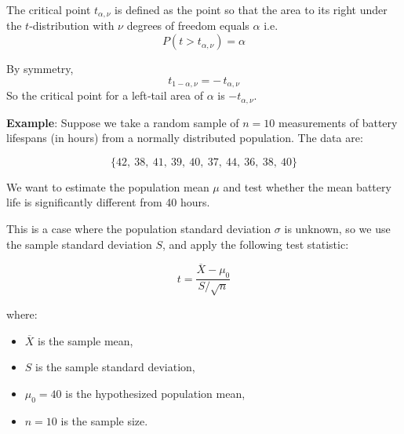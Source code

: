 \documentclass[twoside]{book}
\begin{document}
\begin{center}
\end{center}

The critical point \(t_{\alpha, \nu}\) is defined as the point so that the area to its right under the \(t\)-distribution with \(\nu\) degrees of freedom equals \(\alpha\) i.e.
$$P\left(t > t_{\alpha, \nu} \right)= \alpha$$

By symmetry,
\[
t_{1-\alpha, \nu} = -\,t_{\alpha, \nu}
\]
So the critical point for a left‐tail area of \(\alpha\) is \(-t_{\alpha, \nu}\).

\textbf{Example}: Suppose we take a random sample of \( n = 10 \) measurements of battery lifespans (in hours) from a normally distributed population. The data are:

\[
\{42,\ 38,\ 41,\ 39,\ 40,\ 37,\ 44,\ 36,\ 38,\ 40\}
\]

We want to estimate the population mean \( \mu \) and test whether the mean battery life is significantly different from 40 hours.

This is a case where the population standard deviation \( \sigma \) is unknown, so we use the sample standard deviation \( S \), and apply the following test statistic:

\[
t = \frac{\overline{X} - \mu_0}{S / \sqrt{n}}
\]

where:
\begin{itemize}
  \item \( \overline{X} \) is the sample mean,
  \item \( S \) is the sample standard deviation,
  \item \( \mu_0 = 40 \) is the hypothesized population mean,
  \item \( n = 10 \) is the sample size.
\end{itemize}
\end{document}

